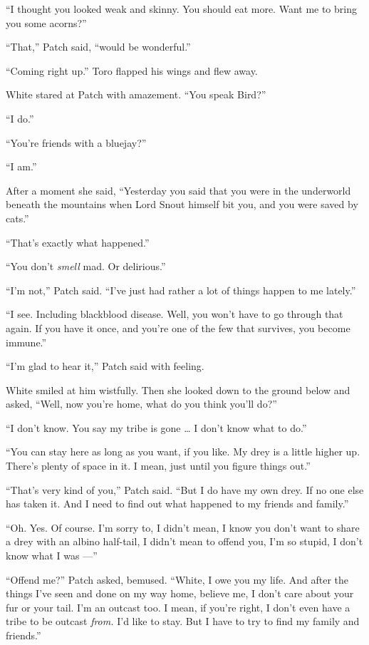 \documentclass[ebook,oneside,openany,12pt]{memoir}
\begin{document}
“I thought you looked weak and skinny. You should eat more. Want me to
bring you some acorns?”

“That,” Patch said, “would be wonderful.”

“Coming right up.” Toro flapped his wings and flew away.

White stared at Patch with amazement. “You speak Bird?”

“I do.”

“You’re friends with a bluejay?”

“I am.”

After a moment she said, “Yesterday you said that you were in the
underworld beneath the mountains when Lord Snout himself bit you, and
you were saved by cats.”

“That’s exactly what happened.”

“You don’t \emph{smell} mad. Or delirious.”

“I’m not,” Patch said. “I’ve just had rather a lot of things happen to
me lately.”

“I see. Including blackblood disease. Well, you won’t have to go
through that again. If you have it once, and you’re one of the few
that survives, you become immune.”

“I’m glad to hear it,” Patch said with feeling.

White smiled at him wistfully. Then she looked down to the ground
below and asked, “Well, now you’re home, what do you think you’ll do?”

“I don’t know. You say my tribe is gone … I don’t know what to do.”

“You can stay here as long as you want, if you like. My drey is a
little higher up. There’s plenty of space in it. I mean, just until
you figure things out.”

“That’s very kind of you,” Patch said. “But I do have my own drey. If
no one else has taken it. And I need to find out what happened to my
friends and family.”

“Oh. Yes. Of course. I’m sorry to, I didn’t mean, I know you don’t
want to share a drey with an albino half-tail, I didn’t mean to offend
you, I’m so stupid, I don’t know what I was —”

“Offend me?” Patch asked, bemused. “White, I owe you my life. And
after the things I’ve seen and done on my way home, believe me, I
don’t care about your fur or your tail. I’m an outcast too. I mean, if
you’re right, I don’t even have a tribe to be outcast \emph{from.}
I’d like to stay. But I have to try to find my family and friends.”
\end{document}
